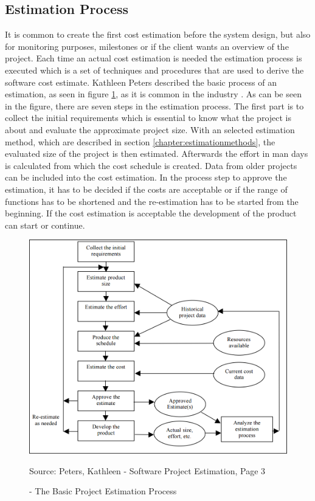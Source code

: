 \subsection{Estimation Process}

It is common to create the first cost estimation before the system design, but also for monitoring purposes, milestones or if the client wants an overview of the project. Each time an actual cost estimation is needed the estimation process is executed which is a set of techniques and procedures that are used to derive the software cost estimate. Kathleen Peters described the basic process of an estimation, as seen in figure \ref{fig:basicEstimationProcess}, as it is common in the industry \cite{estimationProcess}. As can be seen in the figure, there are seven steps in the estimation process. The first part is to collect the initial requirements which is essential to know what the project is about and evaluate the approximate project size. With an selected estimation method, which are described in section \ref{chapter:estimationmethods}, the evaluated size of the project is then estimated. Afterwards the effort in man days is calculated from which the cost schedule is created. Data from older projects can be included into the cost estimation. In the process step to approve the estimation, it has to be decided if the costs are acceptable or if the range of functions has to be shortened and the re-estimation has to be started from the beginning. If the cost estimation is acceptable the development of the product can start or continue.\\
\begin{figure}[h] 
	\centering 
	\includegraphics[width=13cm]{images/estimationProcess.PNG} 
	\caption{- The Basic Project Estimation Process}
	Source: Peters, Kathleen - Software Project Estimation, Page 3  
	\label{fig:basicEstimationProcess}
\end{figure}\\
